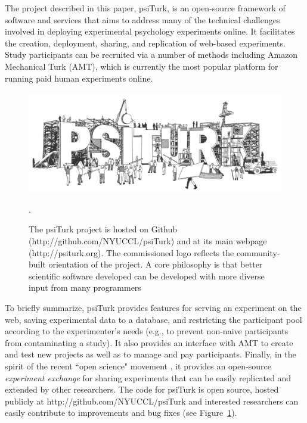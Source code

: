 \documentclass[twocolumn]{svjour3}          %
\begin{document}
The project described in this paper, \textsf{psiTurk}, is an open-source framework of 
software and services that aims to address many of the technical challenges
involved in deploying experimental psychology experiments online.
It facilitates the creation, deployment, sharing, and replication of web-based experiments.
Study participants can be recruited via a number of methods including Amazon 
Mechanical Turk (AMT), which is currently the most popular platform for running 
paid human experiments online.

\begin{figure}[tp]
\centering
\includegraphics[scale=.30]{figures/psiturk_logo.jpg}
\caption{The \textsf{psiTurk} project is hosted on Github 
(http://github.com/NYUCCL/psiTurk) and at its main webpage (\textsf{http://psiturk.org}). 
The commissioned logo reflects the community-built orientation of the project.  A 
core philosophy is that better scientific software developed can be developed 
with more diverse input from many programmers~\citep{Raymond:1999zt}}.
\label{fig:logo}
\end{figure}

To briefly summarize, \textsf{psiTurk} provides features for serving an 
experiment on the web, saving experimental data to a database, and restricting the 
participant pool according to the experimenter's needs (e.g., to prevent non-naive 
participants from contaminating a study). It also provides an interface with AMT to 
create and test new projects as well as to manage and pay participants. Finally, in 
the spirit of the recent ``open science" movement \citep{Collaboration:2012vf},
it provides  an open-source \emph{experiment exchange} for sharing experiments 
that can be easily replicated and extended by other researchers.  The code for 
\textsf{psiTurk} is open source, hosted publicly at
\textsf{http://github.com/NYUCCL/psiTurk} and interested researchers can easily 
contribute to improvements and bug fixes (see Figure~\ref{fig:logo}).
\end{document}
